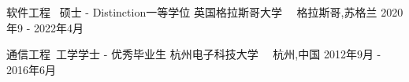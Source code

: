 

\begin{cventries}

  \cventryfour
    {软件工程 \ 硕士 - Distinction一等学位} %
    {英国格拉斯哥大学\ \ } %
    {格拉斯哥,苏格兰} %
    {2020年9 - 2022年4月} %

  \cventryfour
    {通信工程\ 工学学士 - 优秀毕业生} %
    {杭州电子科技大学\ \ } %
    {杭州,中国} %
    {2012年9月 - 2016年6月}

\end{cventries}
